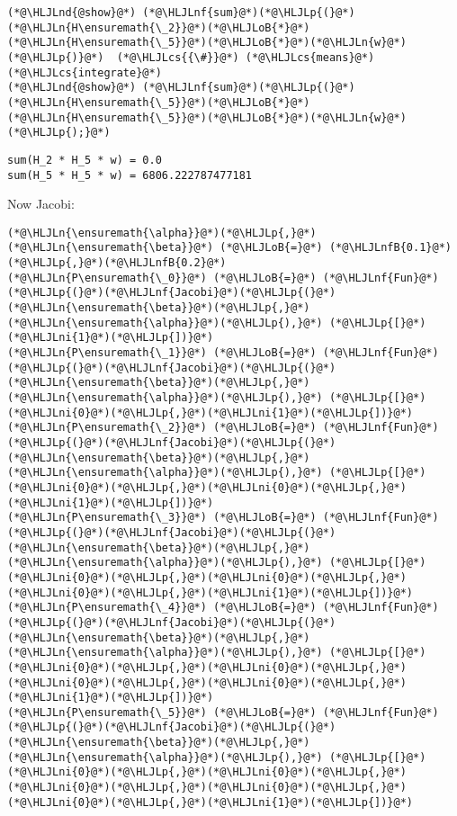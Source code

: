\documentclass[12pt,landscape]{article}
\newcommand{\HLJLn}[1]{#1}
\newcommand{\HLJLnd}[1]{\textcolor[RGB]{214,102,97}{#1}}
\newcommand{\HLJLnf}[1]{\textcolor[RGB]{66,102,213}{#1}}
\newcommand{\HLJLnfB}[1]{\textcolor[RGB]{59,151,46}{#1}}
\newcommand{\HLJLni}[1]{\textcolor[RGB]{59,151,46}{#1}}
\newcommand{\HLJLoB}[1]{\textcolor[RGB]{102,102,102}{\textbf{#1}}}
\newcommand{\HLJLp}[1]{#1}
\newcommand{\HLJLcs}[1]{\textcolor[RGB]{153,153,119}{\textit{#1}}}
\begin{document}
{\begin{lstlisting}
(*@\HLJLnd{@show}@*) (*@\HLJLnf{sum}@*)(*@\HLJLp{(}@*)(*@\HLJLn{H\ensuremath{\_2}}@*)(*@\HLJLoB{*}@*)(*@\HLJLn{H\ensuremath{\_5}}@*)(*@\HLJLoB{*}@*)(*@\HLJLn{w}@*)(*@\HLJLp{)}@*)  (*@\HLJLcs{{\#}}@*) (*@\HLJLcs{means}@*) (*@\HLJLcs{integrate}@*)
(*@\HLJLnd{@show}@*) (*@\HLJLnf{sum}@*)(*@\HLJLp{(}@*)(*@\HLJLn{H\ensuremath{\_5}}@*)(*@\HLJLoB{*}@*)(*@\HLJLn{H\ensuremath{\_5}}@*)(*@\HLJLoB{*}@*)(*@\HLJLn{w}@*)(*@\HLJLp{);}@*)
\end{lstlisting}

\begin{lstlisting}
sum(H_2 * H_5 * w) = 0.0  
sum(H_5 * H_5 * w) = 6806.222787477181
\end{lstlisting}


Now Jacobi:


\begin{lstlisting}
(*@\HLJLn{\ensuremath{\alpha}}@*)(*@\HLJLp{,}@*)(*@\HLJLn{\ensuremath{\beta}}@*) (*@\HLJLoB{=}@*) (*@\HLJLnfB{0.1}@*)(*@\HLJLp{,}@*)(*@\HLJLnfB{0.2}@*)
(*@\HLJLn{P\ensuremath{\_0}}@*) (*@\HLJLoB{=}@*) (*@\HLJLnf{Fun}@*)(*@\HLJLp{(}@*)(*@\HLJLnf{Jacobi}@*)(*@\HLJLp{(}@*)(*@\HLJLn{\ensuremath{\beta}}@*)(*@\HLJLp{,}@*)(*@\HLJLn{\ensuremath{\alpha}}@*)(*@\HLJLp{),}@*) (*@\HLJLp{[}@*)(*@\HLJLni{1}@*)(*@\HLJLp{])}@*)
(*@\HLJLn{P\ensuremath{\_1}}@*) (*@\HLJLoB{=}@*) (*@\HLJLnf{Fun}@*)(*@\HLJLp{(}@*)(*@\HLJLnf{Jacobi}@*)(*@\HLJLp{(}@*)(*@\HLJLn{\ensuremath{\beta}}@*)(*@\HLJLp{,}@*)(*@\HLJLn{\ensuremath{\alpha}}@*)(*@\HLJLp{),}@*) (*@\HLJLp{[}@*)(*@\HLJLni{0}@*)(*@\HLJLp{,}@*)(*@\HLJLni{1}@*)(*@\HLJLp{])}@*)
(*@\HLJLn{P\ensuremath{\_2}}@*) (*@\HLJLoB{=}@*) (*@\HLJLnf{Fun}@*)(*@\HLJLp{(}@*)(*@\HLJLnf{Jacobi}@*)(*@\HLJLp{(}@*)(*@\HLJLn{\ensuremath{\beta}}@*)(*@\HLJLp{,}@*)(*@\HLJLn{\ensuremath{\alpha}}@*)(*@\HLJLp{),}@*) (*@\HLJLp{[}@*)(*@\HLJLni{0}@*)(*@\HLJLp{,}@*)(*@\HLJLni{0}@*)(*@\HLJLp{,}@*)(*@\HLJLni{1}@*)(*@\HLJLp{])}@*)
(*@\HLJLn{P\ensuremath{\_3}}@*) (*@\HLJLoB{=}@*) (*@\HLJLnf{Fun}@*)(*@\HLJLp{(}@*)(*@\HLJLnf{Jacobi}@*)(*@\HLJLp{(}@*)(*@\HLJLn{\ensuremath{\beta}}@*)(*@\HLJLp{,}@*)(*@\HLJLn{\ensuremath{\alpha}}@*)(*@\HLJLp{),}@*) (*@\HLJLp{[}@*)(*@\HLJLni{0}@*)(*@\HLJLp{,}@*)(*@\HLJLni{0}@*)(*@\HLJLp{,}@*)(*@\HLJLni{0}@*)(*@\HLJLp{,}@*)(*@\HLJLni{1}@*)(*@\HLJLp{])}@*)
(*@\HLJLn{P\ensuremath{\_4}}@*) (*@\HLJLoB{=}@*) (*@\HLJLnf{Fun}@*)(*@\HLJLp{(}@*)(*@\HLJLnf{Jacobi}@*)(*@\HLJLp{(}@*)(*@\HLJLn{\ensuremath{\beta}}@*)(*@\HLJLp{,}@*)(*@\HLJLn{\ensuremath{\alpha}}@*)(*@\HLJLp{),}@*) (*@\HLJLp{[}@*)(*@\HLJLni{0}@*)(*@\HLJLp{,}@*)(*@\HLJLni{0}@*)(*@\HLJLp{,}@*)(*@\HLJLni{0}@*)(*@\HLJLp{,}@*)(*@\HLJLni{0}@*)(*@\HLJLp{,}@*)(*@\HLJLni{1}@*)(*@\HLJLp{])}@*)
(*@\HLJLn{P\ensuremath{\_5}}@*) (*@\HLJLoB{=}@*) (*@\HLJLnf{Fun}@*)(*@\HLJLp{(}@*)(*@\HLJLnf{Jacobi}@*)(*@\HLJLp{(}@*)(*@\HLJLn{\ensuremath{\beta}}@*)(*@\HLJLp{,}@*)(*@\HLJLn{\ensuremath{\alpha}}@*)(*@\HLJLp{),}@*) (*@\HLJLp{[}@*)(*@\HLJLni{0}@*)(*@\HLJLp{,}@*)(*@\HLJLni{0}@*)(*@\HLJLp{,}@*)(*@\HLJLni{0}@*)(*@\HLJLp{,}@*)(*@\HLJLni{0}@*)(*@\HLJLp{,}@*)(*@\HLJLni{0}@*)(*@\HLJLp{,}@*)(*@\HLJLni{1}@*)(*@\HLJLp{])}@*)


\end{lstlisting}}
\end{document}
